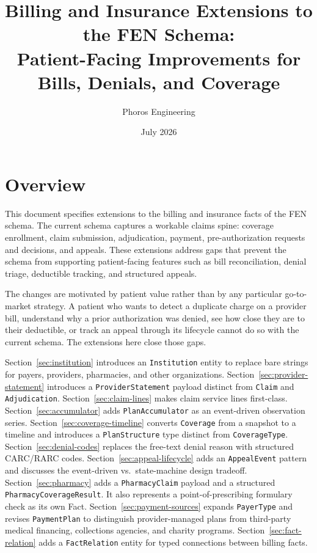 \documentclass[11pt]{article}
\title{Billing and Insurance Extensions to the FEN Schema:\\
Patient-Facing Improvements for Bills, Denials, and Coverage}
\author{Phoros Engineering}
\date{July 2026}
\begin{document}
\maketitle

\section{Overview}

This document specifies extensions to the billing and insurance facts of the
FEN schema. The current schema captures a workable claims spine: coverage
enrollment, claim submission, adjudication, payment, pre-authorization
requests and decisions, and appeals. These extensions address gaps that
prevent the schema from supporting patient-facing features such as bill
reconciliation, denial triage, deductible tracking, and structured appeals.

The changes are motivated by patient value rather than by any particular
go-to-market strategy. A patient who wants to detect a duplicate charge on a
provider bill, understand why a prior authorization was denied, see how
close they are to their deductible, or track an appeal through its
lifecycle cannot do so with the current schema. The extensions here close
those gaps.

Section~\ref{sec:institution} introduces an \texttt{Institution} entity
to replace bare strings for payers, providers, pharmacies, and other
organizations. Section~\ref{sec:provider-statement} introduces a
\texttt{ProviderStatement} payload distinct from \texttt{Claim} and
\texttt{Adjudication}. Section~\ref{sec:claim-lines} makes claim service
lines first-class. Section~\ref{sec:accumulator} adds
\texttt{PlanAccumulator} as an event-driven observation series.
Section~\ref{sec:coverage-timeline} converts \texttt{Coverage} from a
snapshot to a timeline and introduces a \texttt{PlanStructure} type
distinct from \texttt{CoverageType}. Section~\ref{sec:denial-codes}
replaces the free-text denial reason with structured CARC/RARC codes.
Section~\ref{sec:appeal-lifecycle} adds an \texttt{AppealEvent} pattern
and discusses the event-driven vs.\ state-machine design tradeoff.
Section~\ref{sec:pharmacy} adds a \texttt{PharmacyClaim} payload and a
structured \texttt{PharmacyCoverageResult}. It also represents a
point-of-prescribing formulary check as its own Fact.
Section~\ref{sec:payment-sources} expands \texttt{PayerType} and revises
\texttt{PaymentPlan} to distinguish provider-managed plans from
third-party medical financing, collections agencies, and charity
programs. Section~\ref{sec:fact-relation} adds a \texttt{FactRelation}
entity for typed connections between billing facts.
\end{document}
